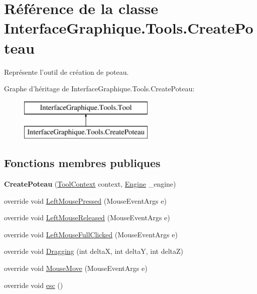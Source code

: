 \hypertarget{class_interface_graphique_1_1_tools_1_1_create_poteau}{\section{Référence de la classe Interface\-Graphique.\-Tools.\-Create\-Poteau}
\label{class_interface_graphique_1_1_tools_1_1_create_poteau}
}


Représente l'outil de création de poteau.  


Graphe d'héritage de Interface\-Graphique.\-Tools.\-Create\-Poteau\-:\begin{figure}[H]
\begin{center}
\leavevmode
\includegraphics[height=2.000000cm]{class_interface_graphique_1_1_tools_1_1_create_poteau}
\end{center}
\end{figure}
\subsection*{Fonctions membres publiques}
\begin{DoxyCompactItemize}
\item 
\hypertarget{class_interface_graphique_1_1_tools_1_1_create_poteau_a20d64c7ebd6fe5c0b579845fa77160a5}{{\bfseries Create\-Poteau} (\hyperlink{class_interface_graphique_1_1_tools_1_1_tool_context}{Tool\-Context} context, \hyperlink{class_interface_graphique_1_1_engine}{Engine} \-\_\-engine)}\label{class_interface_graphique_1_1_tools_1_1_create_poteau_a20d64c7ebd6fe5c0b579845fa77160a5}

\item 
override void \hyperlink{class_interface_graphique_1_1_tools_1_1_create_poteau_a2e2251d85bed79c7b240fc3eb72a29be}{Left\-Mouse\-Pressed} (Mouse\-Event\-Args e)
\item 
override void \hyperlink{class_interface_graphique_1_1_tools_1_1_create_poteau_a1ddd68f567ccb4b8fc5fb06693ec85b1}{Left\-Mouse\-Released} (Mouse\-Event\-Args e)
\item 
override void \hyperlink{class_interface_graphique_1_1_tools_1_1_create_poteau_a659960f2f85f7ff0ff64bd06d2e7cf9c}{Left\-Mouse\-Full\-Clicked} (Mouse\-Event\-Args e)
\item 
override void \hyperlink{class_interface_graphique_1_1_tools_1_1_create_poteau_a30dcd71c461a1afc6fd4dd95c0e2a0ee}{Dragging} (int delta\-X, int delta\-Y, int delta\-Z)
\item 
override void \hyperlink{class_interface_graphique_1_1_tools_1_1_create_poteau_a11cb39fe881af64c1be87c44cc1c8306}{Mouse\-Move} (Mouse\-Event\-Args e)
\item 
override void \hyperlink{class_interface_graphique_1_1_tools_1_1_create_poteau_a523af264dfe1487c08d1d73b309a1095}{esc} ()
\end{DoxyCompactItemize}
